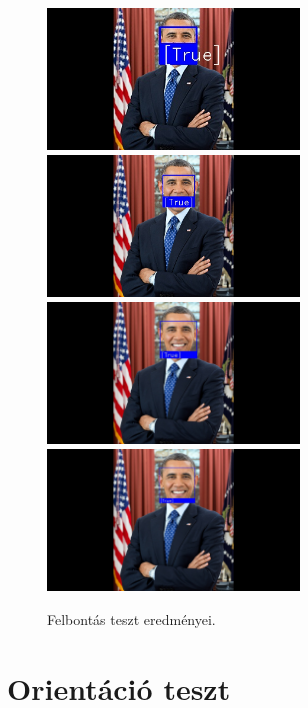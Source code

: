 \begin{figure}[!ht]
    \centering
    \includegraphics[width=67mm, keepaspectratio]{03_images/obama/o-obama-240p.jpg}\hspace{1cm}
    \includegraphics[width=67mm, keepaspectratio]{03_images/obama/o-obama-480p.jpg}\\\vspace{5mm}
    \includegraphics[width=67mm, keepaspectratio]{03_images/obama/o-obama-720p.jpg}\hspace{1cm}
    \includegraphics[width=67mm, keepaspectratio]{03_images/obama/o-obama-1080p.jpg}
    \caption{Felbontás teszt eredményei.}
    \label{fig:felbontasteszt}
\end{figure}

\clearpage
\section{Orientáció teszt}

